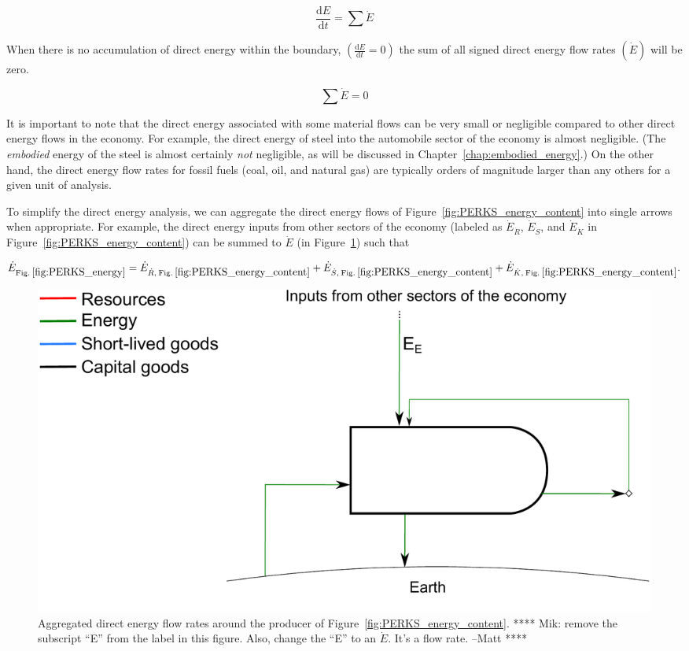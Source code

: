 \begin{equation} \label{eq:First_Law_with_accumulation}
	\frac{\mathrm{d}E}{\mathrm{d}t} = \sum \dot{E}
\end{equation}

When there is no accumulation of direct energy within the boundary,
$\left( \frac{\mathrm{d}E}{\mathrm{d}t} = 0 \right)$ the sum of all 
signed direct energy flow rates $\left( \dot{E} \right)$ will be zero.

\begin{equation} \label{eq:First_Law_no_accumulation}
	\sum \dot{E} = 0
\end{equation}

It is important to note that the direct energy associated with some material flows can
be very small or negligible compared to other direct energy flows in the economy.
For example, the direct energy of steel into the automobile sector of the economy 
is almost negligible. (The \emph{embodied} energy of the steel is almost certainly
\emph{not} negligible, as will be discussed in Chapter~\ref{chap:embodied_energy}.)
On the other hand, the direct energy flow rates for fossil fuels (coal, oil, and natural gas)
are typically orders of magnitude larger than any others for a given unit of analysis.

To simplify the direct energy analysis, 
we can aggregate the direct energy flows of Figure~\ref{fig:PERKS_energy_content}
into single arrows when appropriate. 
For example, the direct energy inputs from other sectors of the economy
(labeled as $\dot{E}_{\dot{R}}$, $\dot{E}_{\dot{S}}$, and $\dot{E}_{\dot{K}}$ 
in Figure~\ref{fig:PERKS_energy_content}) can be summed to $\dot{E}$ 
(in Figure~\ref{fig:PERKS_energy}) such that

\begin{equation} \label{eq:direct_energy_aggregation}
	\dot{E}_{\mathrm{Fig. \: \ref{fig:PERKS_energy}}} 
	= \dot{E}_{\dot{R}, \: \mathrm{Fig. \: \ref{fig:PERKS_energy_content}}} 
	+ \dot{E}_{\dot{S}, \: \mathrm{Fig. \: \ref{fig:PERKS_energy_content}}} 
	+ \dot{E}_{\dot{K}, \: \mathrm{Fig. \: \ref{fig:PERKS_energy_content}}}.
\end{equation}

\begin{figure}[h!]
\centering
\includegraphics[width=0.8\linewidth]{Part_2/Chapter_Energy/images/PERKS_basic_unit_energy.pdf}
\caption{Aggregated direct energy flow rates around 
the producer of Figure~\ref{fig:PERKS_energy_content}.
**** Mik: remove the subscript ``E'' from the label in this figure. Also, change the 
``E'' to an $\dot{E}$. It's a flow rate. --Matt ****}
\label{fig:PERKS_energy}
\end{figure}


